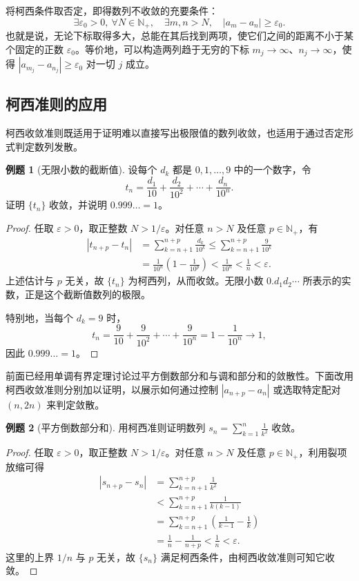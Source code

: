 \documentclass[UTF8, fontset=fandol, a4paper, 12pt]{ctexart}
\newcommand{\Nplus}{\mathbb N_{+}}
\theoremstyle{definition}
\newtheorem*{example}{例题}
\begin{document}
将柯西条件取否定，即得数列不收敛的充要条件：
\[
\exists\varepsilon_0>0,\ \forall N\in\Nplus,\quad
\exists m,n>N,\quad |a_m-a_n|\ge\varepsilon_0.
\]
也就是说，无论下标取得多大，总能在其后找到两项，使它们之间的距离不小于某个固定的正数 $\varepsilon_0$。等价地，可以构造两列趋于无穷的下标 $m_j\to\infty$、$n_j\to\infty$，使得 $|a_{m_j}-a_{n_j}|\ge\varepsilon_0$ 对一切 $j$ 成立。

\subsection*{柯西准则的应用}
柯西收敛准则既适用于证明难以直接写出极限值的数列收敛，也适用于通过否定形式判定数列发散。

\begin{example}[无限小数的截断值]
设每个 $d_k$ 都是 $0,1,\ldots,9$ 中的一个数字，令
\[
t_n=\frac{d_1}{10}+\frac{d_2}{10^2}+\cdots+\frac{d_n}{10^n}.
\]
证明 $\{t_n\}$ 收敛，并说明 $0.999\ldots=1$。
\end{example}
\begin{proof}
任取 $\varepsilon>0$，取正整数 $N>1/\varepsilon$。对任意 $n>N$ 及任意 $p\in\Nplus$，有
\begin{align*}
|t_{n+p}-t_n|
&=\sum_{k=n+1}^{n+p}\frac{d_k}{10^k}
\le\sum_{k=n+1}^{n+p}\frac9{10^k}\\
&=\frac1{10^n}\left(1-\frac1{10^p}\right)
<\frac1{10^n}<\frac1n<\varepsilon.
\end{align*}
上述估计与 $p$ 无关，故 $\{t_n\}$ 为柯西列，从而收敛。无限小数 $0.d_1d_2\cdots$ 所表示的实数，正是这个截断值数列的极限。

特别地，当每个 $d_k=9$ 时，
\[
t_n=\frac9{10}+\frac9{10^2}+\cdots+\frac9{10^n}
=1-\frac1{10^n}\longrightarrow1,
\]
因此 $0.999\ldots=1$。
\end{proof}

前面已经用单调有界定理讨论过平方倒数部分和与调和部分和的敛散性。下面改用柯西收敛准则分别加以证明，以展示如何通过控制 $|a_{n+p}-a_n|$ 或选取特定配对 $(n,2n)$ 来判定敛散。

\begin{example}[平方倒数部分和]
用柯西准则证明数列
$s_n=\displaystyle\sum_{k=1}^{n}\frac1{k^2}$ 收敛。
\end{example}
\begin{proof}
任取 $\varepsilon>0$，取正整数 $N>1/\varepsilon$。对任意 $n>N$ 及任意 $p\in\Nplus$，利用裂项放缩可得
\begin{align*}
|s_{n+p}-s_n|
&=\sum_{k=n+1}^{n+p}\frac1{k^2}\\
&<\sum_{k=n+1}^{n+p}\frac1{k(k-1)}\\
&=\sum_{k=n+1}^{n+p}\left(\frac1{k-1}-\frac1k\right)\\
&=\frac1n-\frac1{n+p}
<\frac1n<\varepsilon.
\end{align*}
这里的上界 $1/n$ 与 $p$ 无关，故 $\{s_n\}$ 满足柯西条件，由柯西收敛准则可知它收敛。
\end{proof}
\end{document}
